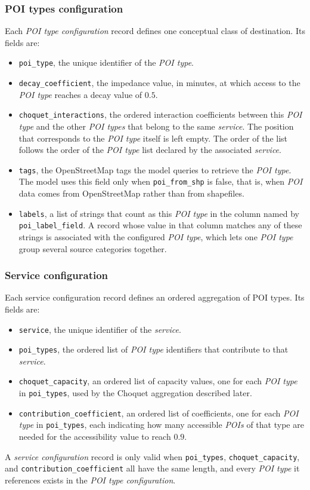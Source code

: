 \documentclass{article}
\begin{document}
\subsubsection*{POI types configuration}
Each \emph{POI type configuration} record defines one conceptual class of destination. Its fields are:
\begin{itemize}
    \item \texttt{poi\_type}, the unique identifier of the \emph{POI type}.
    \item \texttt{decay\_coefficient}, the impedance value, in minutes, at which access to the \emph{POI type} reaches a decay value of \(0.5\).
    \item \texttt{choquet\_interactions}, the ordered interaction coefficients between this \emph{POI type} and the other \emph{POI types} that belong to the same \emph{service}. The position that corresponds to the \emph{POI type} itself is left empty. The order of the list follows the order of the \emph{POI type} list declared by the associated \emph{service}.
    \item \texttt{tags}, the OpenStreetMap tags the model queries to retrieve the \emph{POI type}. The model uses this field only when \texttt{poi\_from\_shp} is false, that is, when \emph{POI} data comes from OpenStreetMap rather than from shapefiles.
    \item \texttt{labels}, a list of strings that count as this \emph{POI type} in the column named by \texttt{poi\_label\_field}. A record whose value in that column matches any of these strings is associated with the configured \emph{POI type}, which lets one \emph{POI type} group several source categories together.
\end{itemize}

\subsubsection*{Service configuration}
Each service configuration record defines an ordered aggregation of POI types. Its fields are:
    \begin{itemize}
        \item \texttt{service}, the unique identifier of the \emph{service}.
        \item \texttt{poi\_types}, the ordered list of \emph{POI type} identifiers that contribute to that \emph{service}.
        \item \texttt{choquet\_capacity}, an ordered list of capacity values, one for each \emph{POI type} in \texttt{poi\_types}, used by the Choquet aggregation described later.
        \item \texttt{contribution\_coefficient}, an ordered list of coefficients, one for each \emph{POI type} in \texttt{poi\_types}, each indicating how many accessible \emph{POIs} of that type are needed for the accessibility value to reach \(0.9\).
    \end{itemize}
A \emph{service configuration} record is only valid when \texttt{poi\_types}, \texttt{choquet\_\allowbreak capacity}, and \texttt{contribution\_\allowbreak coefficient} all have the same length, and every \emph{POI type} it references exists in the \emph{POI type configuration}.
\end{document}
